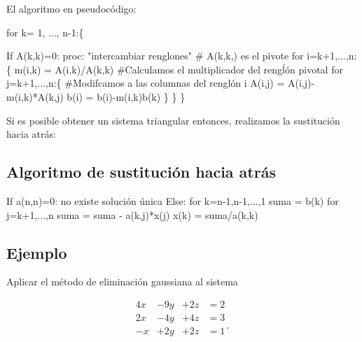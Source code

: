 \documentclass[
]{article}
\newenvironment{Shaded}{\begin{snugshade}}{\end{snugshade}}
\newcommand{\NormalTok}[1]{#1}
\begin{document}
El algoritmo en pseudocódigo:

\begin{Shaded}
\begin{Highlighting}[]
\NormalTok{for k= 1, ..., n{-}1:\{}

\NormalTok{  If A(k,k)=0:  }
\NormalTok{    proc: "intercambiar renglones"}
\NormalTok{    \# A(k,k,) es el pivote}
\NormalTok{    for i=k+1,...,n:\{}
\NormalTok{      m(i,k) = A(i,k)/A(k,k)            \#Calculamos el multiplicador del rengĺón pivotal}
\NormalTok{      for j=k+1,...,n:\{                 \#Modifcamos a las columnas del renglón i}
\NormalTok{        A(i,j)  = A(i,j){-}m(i,k)*A(k,j)}
\NormalTok{        b(i)    = b(i){-}m(i,k)b(k)}
\NormalTok{      \}}
\NormalTok{    \}}
\NormalTok{\}}
\end{Highlighting}
\end{Shaded}

Si es posible obtener un sistema triangular entonces, realizamos la
sustitución hacia atrás:

\hypertarget{algoritmo-de-sustituciuxf3n-hacia-atruxe1s}{%
\subsection{Algoritmo de sustitución hacia
atrás}\label{algoritmo-de-sustituciuxf3n-hacia-atruxe1s}}

\begin{Shaded}
\begin{Highlighting}[]
\NormalTok{If a(n,n)=0:}
\NormalTok{    no existe solución única}
\NormalTok{Else:}
\NormalTok{  for k=n{-}1,n{-}1,...,1}
\NormalTok{    suma = b(k)}
\NormalTok{    for j=k+1,...,n}
\NormalTok{      suma = suma {-} a(k,j)*x(j)}
\NormalTok{    x(k) = suma/a(k,k)}
\end{Highlighting}
\end{Shaded}

\hypertarget{ejemplo}{%
\subsection{Ejemplo}\label{ejemplo}}

Aplicar el método de eliminación gaussiana al sistema

\begin{equation*}
  \begin{matrix}
           4x  & -9 y  & +2z & = 2  \\
           2x & -4 y  & +4z & = 3  \\
           -x & +2 y  & +2z  & = 1´
  \end{matrix}
\end{equation*}
\end{document}
